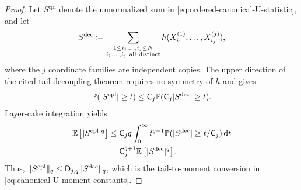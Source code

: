 \documentclass[11pt,reqno]{amsart}
\numberwithin{equation}{section}
\theoremstyle{plain}
\theoremstyle{remark}
\DeclarePairedDelimiter{\pa}{\lparen}{\rparen}
\DeclarePairedDelimiter{\norm}{\lVert}{\rVert}
\newcommand{\md}{\mathrm{d}}
\newcommand{\E}{{\mathbb{E}}}
\newcommand{\Pb}{{\mathbb{P}}}
\begin{document}
\begin{proof}
Let \(S^{\mathrm{cpl}}\) denote the unnormalized sum in \eqref{eq:ordered-canonical-U-statistic}, and let
\begin{align}\label{eq:decoupled-canonical-U-statistic}
 S^{\mathrm{dec}}
 \coloneqq
 \sum_{\substack{1\le i_1,\ldots,i_j\le N\\
 i_1,\ldots,i_j\ \mathrm{all\ distinct}}}
 h\pa{X_{i_1}^{(1)},\ldots,X_{i_j}^{(j)}},
\end{align}
where the \(j\) coordinate families are independent copies.  The upper direction of the cited tail-decoupling theorem requires no symmetry of \(h\) and gives
\begin{align}\label{eq:canonical-U-tail-decoupling}
 \Pb\pa{|S^{\mathrm{cpl}}|\ge t}
 \le \mathsf C_j\Pb\pa{\mathsf C_j|S^{\mathrm{dec}}|\ge t}.
\end{align}
Layer-cake integration yields
\begin{align}\label{eq:canonical-U-layer-cake}
 \E\left[|S^{\mathrm{cpl}}|^q\right]
 &\le \mathsf C_jq\int_0^\infty t^{q-1}
 \Pb\pa{|S^{\mathrm{dec}}|\ge t/\mathsf C_j}\,\md t\notag\\
 &=\mathsf C_j^{q+1}\E\left[|S^{\mathrm{dec}}|^q\right].
\end{align}
Thus, \(\norm{S^{\mathrm{cpl}}}_q\le \mathsf D_{j,q}\norm{S^{\mathrm{dec}}}_q\), which is the tail-to-moment conversion in \eqref{eq:canonical-U-moment-constants}.


\end{proof}
\end{document}
